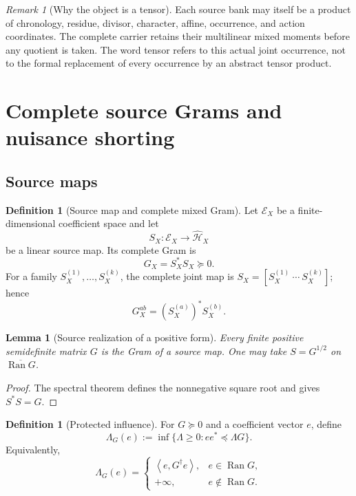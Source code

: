 \documentclass[11pt]{article}
\newtheorem{lemma}[theorem]{Lemma}
\theoremstyle{definition}
\newtheorem{definition}[theorem]{Definition}
\theoremstyle{remark}
\newtheorem{remark}[theorem]{Remark}
\newcommand{\Ran}{\operatorname{Ran}}
\newcommand{\ip}[2]{\left\langle#1,#2\right\rangle}
\begin{document}
\begin{remark}[Why the object is a tensor]
Each source bank may itself be a product of chronology, residue, divisor,
character, affine, occurrence, and action coordinates.  The complete carrier
retains their multilinear mixed moments before any quotient is taken.  The
word tensor refers to this actual joint occurrence, not to the formal
replacement of every occurrence by an abstract tensor product.
\end{remark}

\section{Complete source Grams and nuisance shorting}
\label{sec:gran-sources}

\subsection{Source maps}

\begin{definition}[Source map and complete mixed Gram]
Let $\mathcal E_X$ be a finite-dimensional coefficient space and let
\[
 S_X:\mathcal E_X\longrightarrow\widehat{\mathcal H}_X
\]
be a linear source map.  Its complete Gram is
\[
 G_X=S_X^*S_X\succeq0.
\]
For a family $S_X^{(1)},\ldots,S_X^{(k)}$, the complete joint map is
$S_X=[S_X^{(1)}\ \cdots\ S_X^{(k)}]$; hence
\[
 G_X^{ab}=(S_X^{(a)})^*S_X^{(b)}.
\]
\end{definition}

\begin{lemma}[Source realization of a positive form]
Every finite positive semidefinite matrix $G$ is the Gram of a source map.
One may take $S=G^{1/2}$ on $\overline{\Ran G}$.
\end{lemma}

\begin{proof}
The spectral theorem defines the nonnegative square root and gives
$S^*S=G$.
\end{proof}

\begin{definition}[Protected influence]
For $G\succeq0$ and a coefficient vector $e$, define
\[
 \Lambda_G(e)
 :=\inf\{\Lambda\ge0:ee^*\preceq\Lambda G\}.
\]
Equivalently,
\[
 \Lambda_G(e)=
 \begin{cases}
 \ip{e}{G^\dagger e},&e\in\Ran G,\\
 +\infty,&e\notin\Ran G.
 \end{cases}
\]
\end{definition}
\end{document}
